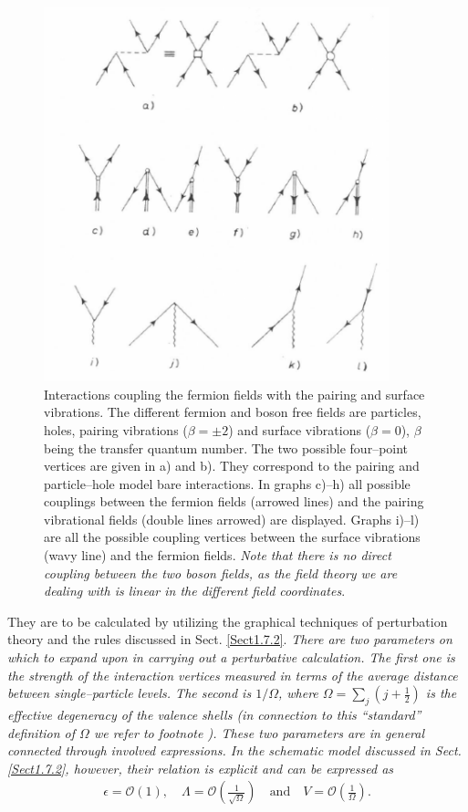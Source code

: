      \begin{figure}
     \centerline {
     \includegraphics*[width=10cm]{introduccion/figs/fig23}
     }
     \caption{Interactions coupling the fermion fields with the pairing and surface vibrations. The different fermion and boson free fields are particles, holes, pairing vibrations ($\beta=\pm2$) and surface vibrations ($\beta=0$), $\beta$ being the transfer quantum number. The two possible four--point vertices are given in a) and b). They correspond to the pairing and particle--hole model bare interactions. In graphs c)--h) all possible couplings between the fermion fields (arrowed lines) and the pairing vibrational fields (double lines arrowed) are displayed. Graphs i)--l) are all the possible coupling vertices between the surface vibrations (wavy line) and the fermion fields. \textit{Note that there is no direct coupling between the two boson fields, as the field theory we are dealing with is linear in the different field coordinates}.}
     \label{figC1A6}
     \end{figure}

They are to be calculated by utilizing the graphical techniques of perturbation theory and the rules discussed in Sect. \ref{Sect1.7.2}. 
\textit{There are two parameters on which to expand upon in carrying out a perturbative  calculation. The first one is the strength of the interaction vertices measured in terms of the average distance between single--particle levels. The second is $1/\Omega$, where $\Omega=\sum_j(j+\frac{1}{2})$ is the effective degeneracy of the valence shells (in connection to this ``standard'' definition of $\Omega$ we refer to footnote ). These two parameters are in general connected through involved expressions. In the schematic model discussed in Sect. \ref{Sect1.7.2}, however, their relation is explicit and can be expressed as}
  \begin{align}\label{eqC1A86} 
   \epsilon=\mathcal O(1),\quad \Lambda=\mathcal O\left(\frac{1}{\sqrt{\Omega}}\right)\quad \text{and}\quad V=\mathcal O\left(\frac{1}{\Omega}\right).
    \end{align}   

